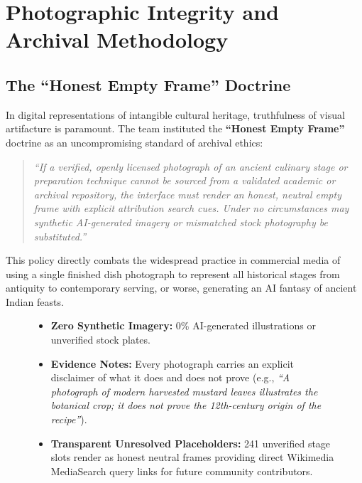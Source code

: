 \documentclass[11pt,a4paper]{report}
\begin{document}
\chapter{Photographic Integrity and Archival Methodology}

\section{The ``Honest Empty Frame'' Doctrine}
In digital representations of intangible cultural heritage, truthfulness of visual artifacture is paramount. The team instituted the \textbf{``Honest Empty Frame''} doctrine as an uncompromising standard of archival ethics:

\begin{quote}
\itshape
``If a verified, openly licensed photograph of an ancient culinary stage or preparation technique cannot be sourced from a validated academic or archival repository, the interface must render an honest, neutral empty frame with explicit attribution search cues. Under no circumstances may synthetic AI-generated imagery or mismatched stock photography be substituted.''
\end{quote}

This policy directly combats the widespread practice in commercial media of using a single finished dish photograph to represent all historical stages from antiquity to contemporary serving, or worse, generating an AI fantasy of ancient Indian feasts.

\begin{figure}[ht]
    \centering
    \begin{integritybadge}
        \begin{itemize}[leftmargin=5mm]
            \item \textbf{Zero Synthetic Imagery:} 0\% AI-generated illustrations or unverified stock plates.
            \item \textbf{Evidence Notes:} Every photograph carries an explicit disclaimer of what it does and does not prove (e.g., \emph{``A photograph of modern harvested mustard leaves illustrates the botanical crop; it does not prove the 12th-century origin of the recipe''}).
            \item \textbf{Transparent Unresolved Placeholders:} 241 unverified stage slots render as honest neutral frames providing direct Wikimedia MediaSearch query links for future community contributors.
        \end{itemize}
    \end{integritybadge}
\end{figure}
\end{document}
